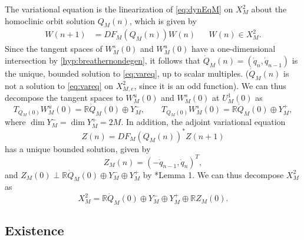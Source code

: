 \documentclass[12pt,reqno]{amsart}
\def\R{{\mathbb R}}
\theoremstyle{definition}
\begin{document}
The variational equation is the linearization of \cref{eq:dynEqM} on $X_M^2$ about the homoclinic orbit solution $Q_M(n)$, which is given by
\begin{equation}\label{eq:vareq}
\begin{aligned}
W(n+1) &= DF_M(Q_M(n)) W(n) && W(n) \in X_M^2.
\end{aligned}
\end{equation}
Since the tangent spaces of $W_M^s(0)$ and $W_M^u(0)$ have a one-dimensional intersection by \cref{hyp:breathernondegen}, it follows that $\dot{Q}_M(n) = (\dot{q}_n, \dot{q}_{n-1})$ is the unique, bounded solution to \cref{eq:vareq}, up to scalar multiples. ($\dot{Q}_M(n)$ is not a solution to \cref{eq:vareq} on $X_{M,e}^2$, since it is an odd function). We can thus decompose the tangent spaces to $W_M^u(0)$ and $W_M^s(0)$ at $U_M^1(0)$ as
\begin{equation}\label{eq:TWdecomp}
T_{Q_M(0)}W^u_M(0) = \R \dot{Q}_M(0) \oplus Y_M^-, \qquad  
T_{Q_M(0)}W^s_M(0) = \R \dot{Q}_M(0) \oplus Y_M^+,
\end{equation}
where $\dim Y_M^- = \dim Y_M^+ = 2M$. In addition, the adjoint variational equation
\begin{equation}\label{eq:adjvareq}
Z(n) = DF_M(Q_M(n))^* Z(n+1)
\end{equation}
has a unique bounded solution, given by
\begin{equation}\label{eq:Z1}
Z_M(n) = (-\dot{q}_{n-1}, \dot{q}_n)^T,
\end{equation}
and $Z_M(0) \perp \R \dot{Q}_M(0) \oplus Y_M^- \oplus Y_M^+$ by \cite{Parker2020}*{Lemma 1}. We can thus decompose $X_M^2$ as
\begin{equation}\label{eq:Xdecomp}
X_M^2= \R \dot{Q}_M(0) \oplus Y_M^- \oplus Y_M^+ \oplus \R Z_M(0).
\end{equation}

\subsection{Existence}
\end{document}
